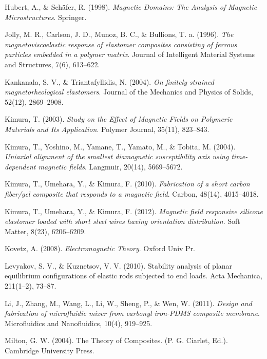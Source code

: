 \documentclass[oneside]{article}
\begin{document}
\begin{thebibliography}{9}
				 Hubert, A., \& Sch{\"a}fer, R. (1998). \textit{Magnetic Domains: The Analysis of Magnetic Microstructures}. Springer. 
				
				 Jolly, M. R., Carlson, J. D., Munoz, B. C., \& Bullions, T. a. (1996). \textit{The magnetoviscoelastic response of elastomer composites consisting of ferrous particles embedded in a polymer matrix}. Journal of Intelligent Material Systems and Structures, 7(6), 613--622. 
				
				 Kankanala, S. V., \& Triantafyllidis, N. (2004). \textit{On finitely strained magnetorheological elastomers}. Journal of the Mechanics and Physics of Solids, 52(12), 2869--2908. 
				
				 Kimura, T. (2003). \textit{Study on the Effect of Magnetic Fields on Polymeric Materials and Its Application}. Polymer Journal, 35(11), 823--843.
				
				 Kimura, T., Yoshino, M., Yamane, T., Yamato, M., \& Tobita, M. (2004). \textit{Uniaxial alignment of the smallest diamagnetic susceptibility axis using time-dependent magnetic fields}. Langmuir, 20(14), 5669--5672. 
				
				 Kimura, T., Umehara, Y., \& Kimura, F. (2010).\textit{ Fabrication of a short carbon fiber/gel composite that responds to a magnetic field}. Carbon, 48(14), 4015--4018. 
				
				 Kimura, T., Umehara, Y., \& Kimura, F. (2012). \textit{Magnetic field responsive silicone elastomer loaded with short steel wires having orientation distribution}. Soft Matter, 8(23), 6206--6209. 
				
				 Kovetz, A. (2008).\textit{ Electromagnetic Theory}. Oxford Univ Pr. 
				
				 Levyakov, S. V., \& Kuznetsov, V. V. (2010). Stability analysis of planar equilibrium configurations of elastic rods subjected to end loads. Acta Mechanica, 211(1--2), 73--87.
				
				 Li, J., Zhang, M., Wang, L., Li, W., Sheng, P., \& Wen, W. (2011). \textit{Design and fabrication of microfluidic mixer from carbonyl iron-PDMS composite membrane}. Microfluidics and Nanofluidics, 10(4), 919--925. 
				
				 Milton, G. W. (2004). The Theory of Composites. (P. G. Ciarlet, Ed.). Cambridge University Press.
				

\end{thebibliography}
\end{document}

